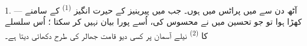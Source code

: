 %
%
%
%

\VUsaut{4.0mm}
\VUsaut{3.0mm}

\VUsaut{3.0mm}

\VUsaut{3.0mm}

1. --- آٹھ دن سے میں پراٹس میں ہوں۔ جب میں پیرینیز کے حیرت انگیز
 \textsuperscript{(1)} کے سامنے کھڑا ہوا تو جو
تحسین میں نے محسوس کی، اُسے پورا بیان نہیں کر سکتا ؛ اُس سلسلے کا
 \textsuperscript{(2)} نیلے آسمان پر کسی دیو قامت جھالر
کی طرح دکھائی دیتا ہے۔

